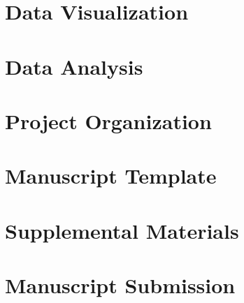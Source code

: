 \documentclass[]{book}
\begin{document}
\chapter{Data Visualization}\label{data-visualization}

\chapter{Data Analysis}\label{data-analysis}

\chapter{Project Organization}\label{project-organization}

\chapter{Manuscript Template}\label{manuscript-template}

\chapter{Supplemental Materials}\label{supplemental-materials}

\chapter{Manuscript Submission}\label{manuscript-submission}


\end{document}

